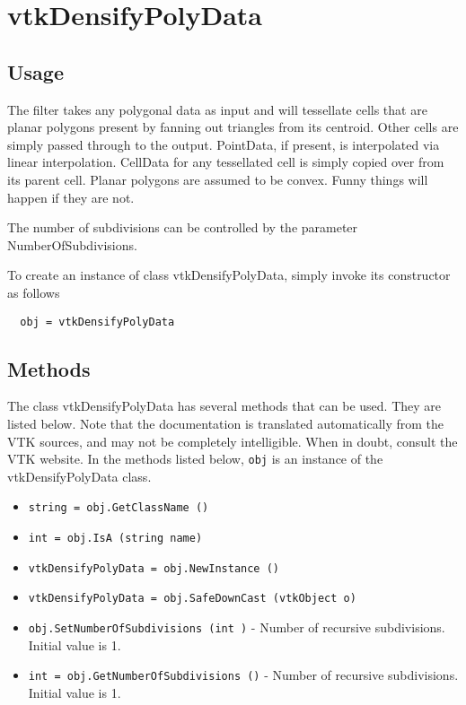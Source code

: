 \section{vtkDensifyPolyData}

\subsection{Usage}

 The filter takes any polygonal data as input and will tessellate cells that 
 are planar polygons present by fanning out triangles from its centroid. 
 Other cells are simply passed through to the output.  PointData, if present,
 is interpolated via linear interpolation. CellData for any tessellated cell
 is simply copied over from its parent cell. Planar polygons are assumed to 
 be convex. Funny things will happen if they are not.
 
 The number of subdivisions can be controlled by the parameter
 NumberOfSubdivisions.

To create an instance of class vtkDensifyPolyData, simply
invoke its constructor as follows
\begin{verbatim}
  obj = vtkDensifyPolyData
\end{verbatim}
\subsection{Methods}

The class vtkDensifyPolyData has several methods that can be used.
  They are listed below.
Note that the documentation is translated automatically from the VTK sources,
and may not be completely intelligible.  When in doubt, consult the VTK website.
In the methods listed below, \verb|obj| is an instance of the vtkDensifyPolyData class.
\begin{itemize}
\item  \verb|string = obj.GetClassName ()|

\item  \verb|int = obj.IsA (string name)|

\item  \verb|vtkDensifyPolyData = obj.NewInstance ()|

\item  \verb|vtkDensifyPolyData = obj.SafeDownCast (vtkObject o)|

\item  \verb|obj.SetNumberOfSubdivisions (int )| -  Number of recursive subdivisions. Initial value is 1.

\item  \verb|int = obj.GetNumberOfSubdivisions ()| -  Number of recursive subdivisions. Initial value is 1.

\end{itemize}
